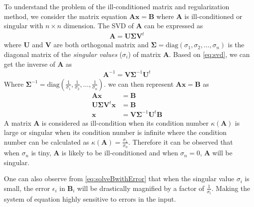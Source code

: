 			To understand the problem of the ill-conditioned matrix and regularization method, we consider the matrix equation $\boldsymbol{Ax}=\boldsymbol{B}$ where $\boldsymbol{A}$ is ill-conditioned or singular with $n\times n$ dimension.
			The \gls{SVD} of $\boldsymbol{A}$ can be expressed as 
			\begin{align}
				\boldsymbol{A} = \boldsymbol{U\Sigma V}^t
				\label{eq:svd}
			\end{align}
			where $\boldsymbol{U}$ and $\boldsymbol{V}$ are both orthogonal matrix and $\boldsymbol{\Sigma}=\mathrm{diag}(\sigma_1,\sigma_2,\dots,\sigma_n)$ is the diagonal matrix of the \emph{singular values} ($\sigma_i$) of matrix $\boldsymbol{A}$.
			Based on \cref{eq:svd}, we can get the inverse of $\boldsymbol{A}$ as 
			\begin{align}
				\boldsymbol{A}^{-1}= \boldsymbol{V\Sigma}^{-1}\boldsymbol{U}^t
				\label{eq:svdInverse}
			\end{align}
			Where $
			\boldsymbol{\Sigma}^{-1} = \mathrm{diag}(\frac{1}{\sigma_1},\frac{1}{\sigma_2},\dots,\frac{1}{\sigma_n})$.
			we can then represent $\boldsymbol{Ax}=\boldsymbol{B}$ as
			\begin{align}
				\boldsymbol{Ax}&=\boldsymbol{B} \nonumber\\
				\boldsymbol{U\Sigma V}^t\boldsymbol{x}&=\boldsymbol{B} \nonumber\\
				\boldsymbol{x}&=\boldsymbol{V\Sigma}^{-1}\boldsymbol{U}^t\boldsymbol{B}
				\label{eq:solveBwithError}
			\end{align}
			A matrix $\boldsymbol{A}$ is considered as ill-condition when its condition number $\kappa(\boldsymbol{A})$ is large or singular when its condition number is infinite where the condition number can be calculated as $\kappa(\boldsymbol{A})=\frac{\sigma_1}{\sigma_n}$.
			Therefore it can be observed that when $\sigma_n$ is tiny, $\boldsymbol{A}$ is likely to be ill-conditioned and when $\sigma_n=0$, $\boldsymbol{A}$ will be singular. 
			
			One can also observe from \cref{eq:solveBwithError} that when the singular value $\sigma_i$ is small, the error $\epsilon_i$ in $\boldsymbol{B}_i$ will be drastically magnified by a factor of $\frac{1}{\sigma_i}$. 
			Making the system of equation highly sensitive to errors in the input.
			
